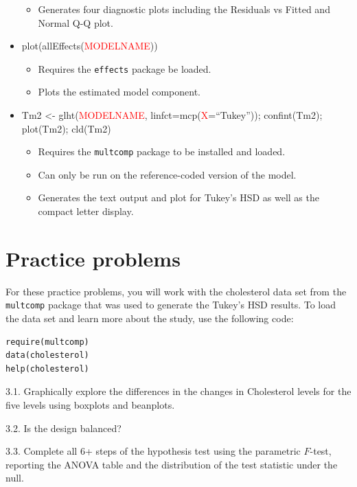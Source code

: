 \documentclass[]{book}
\providecommand{\tightlist}{%
  \setlength{\itemsep}{0pt}\setlength{\parskip}{0pt}}
\theoremstyle{definition}
\theoremstyle{definition}
\theoremstyle{remark}
\begin{document}
\begin{itemize}
  \begin{itemize}
  \tightlist
  \item
    Generates four diagnostic plots including the Residuals vs Fitted
    and Normal Q-Q plot.
  \end{itemize}
\item
  plot(allEffects(\textcolor{red}{MODELNAME}))

  \begin{itemize}
  \item
    Requires the \texttt{effects} package be loaded.
  \item
    Plots the estimated model component.
  \end{itemize}
\item
  Tm2 \textless{}- glht(\textcolor{red}{MODELNAME},
  linfct=mcp(\textcolor{red}{X}=``Tukey'')); confint(Tm2); plot(Tm2);
  cld(Tm2)

  \begin{itemize}
  \item
    Requires the \texttt{multcomp} package to be installed and loaded.
  \item
    Can only be run on the reference-coded version of the model.
  \item
    Generates the text output and plot for Tukey's HSD as well as the
    compact letter display.
  \end{itemize}
\end{itemize}

\section{Practice problems}\label{section3-10}

For these practice problems, you will work with the cholesterol data set
from the \texttt{multcomp} package that was used to generate the Tukey's
HSD results. To load the data set and learn more about the study, use
the following code:

\begin{verbatim}
require(multcomp)
data(cholesterol)
help(cholesterol)
\end{verbatim}

3.1. Graphically explore the differences in the changes in Cholesterol
levels for the five levels using boxplots and beanplots.

3.2. Is the design balanced?

3.3. Complete all 6+ steps of the hypothesis test using the parametric
\(F\)-test, reporting the ANOVA table and the distribution of the test
statistic under the null.
\end{document}
